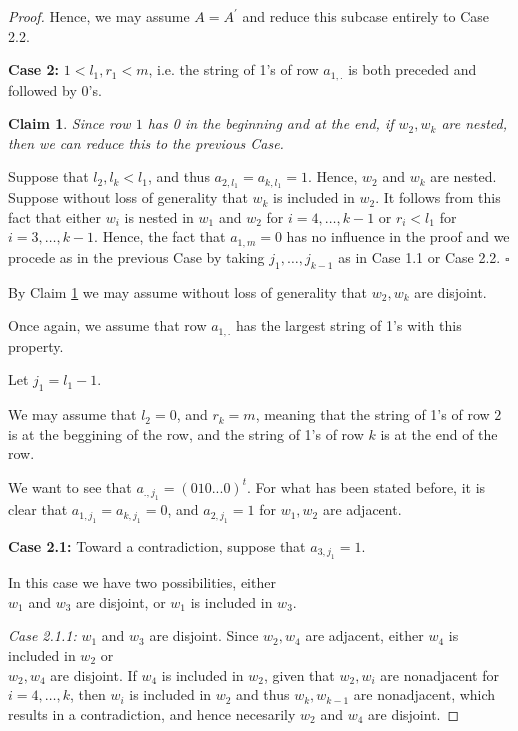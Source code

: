 \documentclass[a4paper,10pt]{report}
\theoremstyle{plain}
\newtheorem{claim}{Claim}[section]
\theoremstyle{remark}
\theoremstyle{plain}
\newcommand*{\QED}{\hfill\ensuremath{\square}}%
\begin{document}
\begin{proof}
	\vspace{.5mm}
	Hence, we may assume $A= A^{'}$ and reduce this subcase entirely to Case 2.2.

	\vspace{1mm}	
	\textbf{Case 2:} $1 < l_1, r_1 < m$, i.e. the string of 1's of row $a_{1,.}$ is both preceded and followed by 0's. 
	
	\begin{claim} \label{2N_c2_A}
		Since row $1$ has 0 in the beginning and at the end,
		if $w_2, w_k$ are nested, then we can reduce this to the previous Case.
	\end{claim}	
	
	Suppose that $l_2, l_k < l_1$, and thus $a_{2,l_1} = a_{k,l_1} =1$.
	Hence, $w_2$ and $w_k$ are nested. Suppose without loss of generality that $w_k$ is included in $w_2$. 
	It follows from this fact that either $w_i$ is nested in $w_1$ and $w_2$ for $i = 4, \ldots, k-1$ or $r_i < l_1$ for $i = 3, \ldots, k-1$.
	Hence, the fact that $a_{1, m} = 0$ has no influence in the proof
	and we procede as in the previous Case by taking $j_1, \ldots, j_{k-1}$ as in Case 1.1 or Case 2.2. \QED

	By Claim \ref{2N_c2_A} we may assume without loss of generality that $w_2,w_k$ are disjoint.

	\vspace{.5mm}
	Once again, we assume that row $a_{1,.}$ has the largest string of 1's  with this property.
	
	Let $j_1 = l_1 -1$.
		
	We may assume that $l_2 = 0$, and $r_k = m$, meaning that the string of 1's of row $2$ is at the beggining of the row, and the string of 1's of row $k$
	is at the end of the row.
	
	We want to see that $a_{., j_1} = ( 0 1 0 ... 0 )^{t}$. 
	For what has been stated before, it is clear that $a_{1,j_1} = a_{k,j_1} = 0$, and $a_{2,j_1} = 1$ for $w_1, w_2$ are adjacent.
	
	\textbf{Case 2.1:} Toward a contradiction, suppose that $a_{3,j_1} = 1$.
	
	In this case we have two possibilities, either \\
	$w_1$ and $w_3$ are disjoint, or $w_1$ is included in $w_3$.
	
	\textit{Case 2.1.1:} $w_1$ and $w_3$ are disjoint.
	Since $w_2, w_4$ are adjacent, either $w_4$ is included in $w_2$ or \\
	$w_2, w_4$ are disjoint.
	If $w_4$ is included in $w_2$, given that $w_2, w_i$ are nonadjacent for $i= 4, \ldots, k$, 
	then $w_i$ is included in $w_2$ and thus $w_k, w_{k-1}$ are nonadjacent, 
	which results in a contradiction, and hence necesarily $w_2$ and $w_4$ are disjoint.
	

\end{proof}
\end{document}
